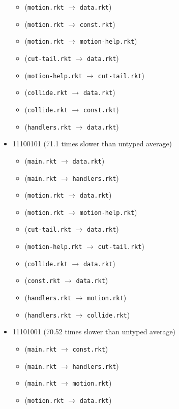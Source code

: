 \documentclass{article}
\newcommand{\mono}[1]{\texttt{#1}}
\begin{document}
\begin{itemize}
\begin{itemize}
  \item (\mono{motion.rkt} $\rightarrow$ \mono{data.rkt})
  \item (\mono{motion.rkt} $\rightarrow$ \mono{const.rkt})
  \item (\mono{motion.rkt} $\rightarrow$ \mono{motion-help.rkt})
  \item (\mono{cut-tail.rkt} $\rightarrow$ \mono{data.rkt})
  \item (\mono{motion-help.rkt} $\rightarrow$ \mono{cut-tail.rkt})
  \item (\mono{collide.rkt} $\rightarrow$ \mono{data.rkt})
  \item (\mono{collide.rkt} $\rightarrow$ \mono{const.rkt})
  \item (\mono{handlers.rkt} $\rightarrow$ \mono{data.rkt})
  \end{itemize}
\item 11100101 (71.1 times slower than untyped average)
  \begin{itemize}
  \item (\mono{main.rkt} $\rightarrow$ \mono{data.rkt})
  \item (\mono{main.rkt} $\rightarrow$ \mono{handlers.rkt})
  \item (\mono{motion.rkt} $\rightarrow$ \mono{data.rkt})
  \item (\mono{motion.rkt} $\rightarrow$ \mono{motion-help.rkt})
  \item (\mono{cut-tail.rkt} $\rightarrow$ \mono{data.rkt})
  \item (\mono{motion-help.rkt} $\rightarrow$ \mono{cut-tail.rkt})
  \item (\mono{collide.rkt} $\rightarrow$ \mono{data.rkt})
  \item (\mono{const.rkt} $\rightarrow$ \mono{data.rkt})
  \item (\mono{handlers.rkt} $\rightarrow$ \mono{motion.rkt})
  \item (\mono{handlers.rkt} $\rightarrow$ \mono{collide.rkt})
  \end{itemize}
\item 11101001 (70.52 times slower than untyped average)
  \begin{itemize}
  \item (\mono{main.rkt} $\rightarrow$ \mono{const.rkt})
  \item (\mono{main.rkt} $\rightarrow$ \mono{handlers.rkt})
  \item (\mono{main.rkt} $\rightarrow$ \mono{motion.rkt})
  \item (\mono{motion.rkt} $\rightarrow$ \mono{data.rkt})

\end{itemize}
\end{itemize}
\end{document}
